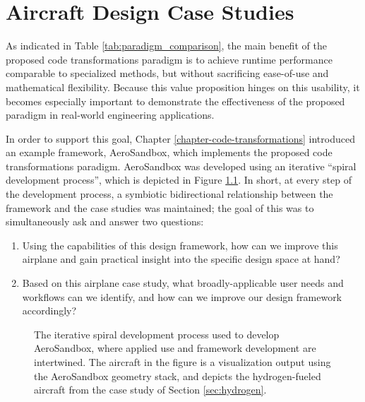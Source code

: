 \chapter{Aircraft Design Case Studies}

As indicated in Table \ref{tab:paradigm_comparison}, the main benefit of the proposed code transformations paradigm is to achieve runtime performance comparable to specialized methods, but without sacrificing ease-of-use and mathematical flexibility. Because this value proposition hinges on this usability, it becomes especially important to demonstrate the effectiveness of the proposed paradigm in real-world engineering applications.

In order to support this goal, Chapter \ref{chapter-code-transformations} introduced an example framework, AeroSandbox, which implements the proposed code transformations paradigm. AeroSandbox was developed using an iterative ``spiral development process'', which is depicted in Figure \ref{fig:spiral}. In short, at every step of the development process, a symbiotic bidirectional relationship between the framework and the case studies was maintained; the goal of this was to simultaneously ask and answer two questions:

\begin{enumerate}[noitemsep]
    \item Using the capabilities of this design framework, how can we improve this airplane and gain practical insight into the specific design space at hand?
    \item Based on this airplane case study, what broadly-applicable user needs and workflows can we identify, and how can we improve our design framework accordingly?
\end{enumerate}

\begin{figure}[H]
    \centering
    
    \caption{The iterative spiral development process used to develop AeroSandbox, where applied use and framework development are intertwined. The aircraft in the figure is a visualization output using the AeroSandbox geometry stack, and depicts the hydrogen-fueled aircraft from the case study of Section \ref{sec:hydrogen}.}
    \label{fig:spiral}
\end{figure}

